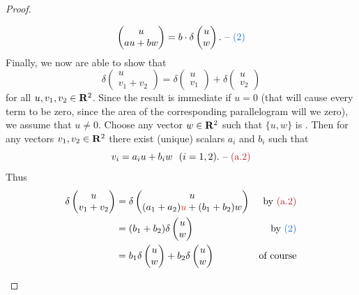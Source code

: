\begin{proof}
\begin{enumerate}
\[\begin{pmatrix}
        u \\ au + bw
    \end{pmatrix}
    = b \cdot \delta \begin{pmatrix}
        u \\ w
    \end{pmatrix}. \text{ -- \BLUE{(2)}}
\]
Finally, we now are able to show that
\[
    \delta \begin{pmatrix}
        u \\ v_1 + v_2
    \end{pmatrix}
    = \delta \begin{pmatrix}
        u \\ v_1
    \end{pmatrix}
    + \delta \begin{pmatrix}
        u \\ v_2
    \end{pmatrix}
\]
for all \(u, v_1, v_2 \in \mathbf{R}^2\).
Since the result is immediate if \(u = 0\)
(that will cause every term to be zero, since the area of the corresponding parallelogram will we zero),
we assume that \(u \ne 0\).
Choose any vector \(w \in \mathbf{R}^2\) such that \(\{ u, w \}\) is \emph{\LID{}}.
Then for any vectors \(v_1, v_2 \in \mathbf{R}^2\) there exist (unique) scalars \(a_i\) and \(b_i\) such that
\[
    v_i = a_i u + b_i w \ \  (i = 1, 2). \text{ -- \MAROON{(a.2)}}
\]
Thus
\begin{align*}
    \delta \begin{pmatrix}
        u \\ v_1 + v_2
    \end{pmatrix}
    & = \delta \begin{pmatrix}
            u \\ (a_1 + a_2) \RED{u} + (b_1 + b_2) w
        \end{pmatrix} & \text{by \MAROON{(a.2)}} \\
    & = (b_1 + b_2) \delta \begin{pmatrix}
            u \\ w
        \end{pmatrix} & \text{by \BLUE{(2)}} \\
    & = b_1 \delta \begin{pmatrix}
            u \\ w
        \end{pmatrix}
      + b_2 \delta \begin{pmatrix}
            u \\ w
        \end{pmatrix} & \text{of course} \\

\end{align*}
\end{enumerate}
\end{proof}
